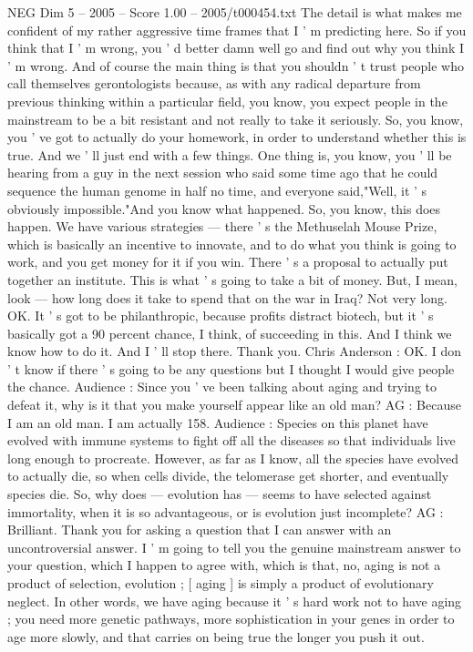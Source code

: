 \begin{textsample}{NEG Dim 5 – 2005 – Score 1.00 – 2005/t000454.txt}
The detail is what makes me confident of my rather aggressive time frames that I ' m predicting here.
So if you think that I ' m wrong, you ' d better damn well go and find out why you think I ' m wrong.
And of course the main thing is that you shouldn ' t trust people who call themselves gerontologists because, as with any radical departure from previous thinking within a particular field, you know, you expect people in the mainstream to be a bit resistant and not really to take it seriously.
So, you know, you ' ve got to actually do your homework, in order to understand whether this is true.
And we ' ll just end with a few things.
One thing is, you know, you ' ll be hearing from a guy in the next session who said some time ago that he could sequence the human genome in half no time, and everyone said,"Well, it ' s obviously impossible."And you know what happened.
So, you know, this does happen.
We have various strategies — there ' s the Methuselah Mouse Prize, which is basically an incentive to innovate, and to do what you think is going to work, and you get money for it if you win.
There ' s a proposal to actually put together an institute.
This is what ' s going to take a bit of money.
But, I mean, look — how long does it take to spend that on the war in Iraq?
Not very long.
OK.
It ' s got to be philanthropic, because profits distract biotech, but it ' s basically got a 90 percent chance, I think, of succeeding in this.
And I think we know how to do it.
And I ' ll stop there.
Thank you.
Chris Anderson : OK.
I don ' t know if there ' s going to be any questions but I thought I would give people the chance.
Audience : Since you ' ve been talking about aging and trying to defeat it, why is it that you make yourself appear like an old man?
AG : Because I am an old man.
I am actually 158.
Audience : Species on this planet have evolved with immune systems to fight off all the diseases so that individuals live long enough to procreate.
However, as far as I know, all the species have evolved to actually die, so when cells divide, the telomerase get shorter, and eventually species die.
So, why does — evolution has — seems to have selected against immortality, when it is so advantageous, or is evolution just incomplete?
AG : Brilliant.
Thank you for asking a question that I can answer with an uncontroversial answer.
I ' m going to tell you the genuine mainstream answer to your question, which I happen to agree with, which is that, no, aging is not a product of selection, evolution ; [ aging ] is simply a product of evolutionary neglect.
In other words, we have aging because it ' s hard work not to have aging ; you need more genetic pathways, more sophistication in your genes in order to age more slowly, and that carries on being true the longer you push it out.

\end{textsample}
